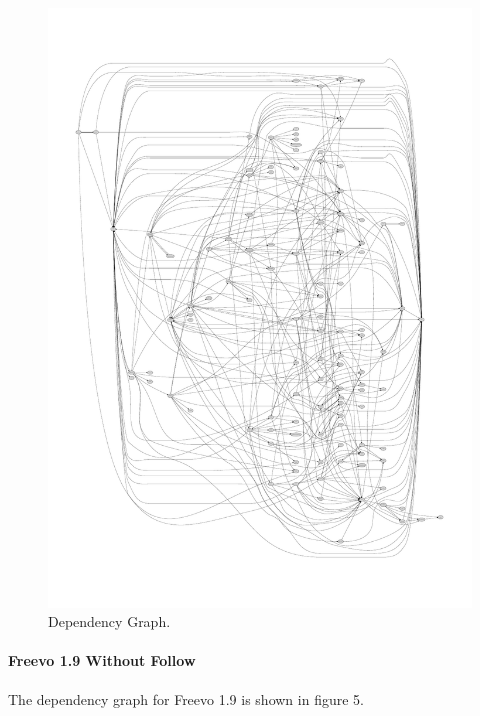 \documentclass[10.5pt,journal, a4paper]{IEEEtran}
\begin{document}
\begin{figure}[H]
 \centering 
 \includegraphics[width=\columnwidth]{freevo18less}
 \centering 
  \caption {Dependency Graph. }
 \end{figure}



\paragraph{Freevo 1.9 Without Follow}
\noindent
The dependency graph for Freevo 1.9 is shown in figure 5.
\end{document}
